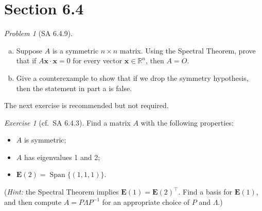 \documentclass[fleqn,11pt]{paper}
\theoremstyle{remark}
\newtheorem{problem}{Problem}
\newtheorem*{solution}{{\bf Solution}}
\newtheorem*{ex}{Exercise}
\newcommand\R{\fld{R}}
\renewcommand{\vec}[1]{\mathbf{#1}}
\newcommand{\<}{\ensuremath{\langle}}
\renewcommand{\>}{\ensuremath{\rangle}}
\newcommand\fld[1]{\ensuremath{\mathbb{#1}}}
\newcommand\vx{\vec{x}}
\newcommand\bE{\ensuremath{\mathbf E}}
\newcommand\Span{\ensuremath{\operatorname{Span}}}
\begin{document}
\section*{Section 6.4}
\begin{problem}[SA 6.4.9]\
  \begin{enumerate}[a.]
  \item   Suppose $A$ is a symmetric $n \times n$ matrix. Using the Spectral Theorem, 
    prove that if $A\vx \cdot \vx = 0$ for every vector $\vx \in \R^n$, then $A = O$.
  \item Give a counterexample to show that if we drop the symmetry hypothesis, then the statement
    in part a is false.
  \end{enumerate}
\end{problem}
\newpage
\noindent The next exercise is recommended but not required.
\begin{ex}[cf.~SA 6.4.3]
Find a matrix $A$ with the following properties:
\begin{itemize}
\item $A$ is symmetric;
\item $A$ has eigenvalues 1 and 2;
\item $\bE(2) = \Span \bigl\{(1,1,1)\bigr\}$. %
\end{itemize}
({\it Hint:} the Spectral Theorem implies $\bE(1) =\bE(2)^\top$.
Find a basis for $\bE(1)$, and then compute $A = P \Lambda P^{-1}$ for 
an appropriate choice of $P$ and $\Lambda$.)
\end{ex}
\end{document}
